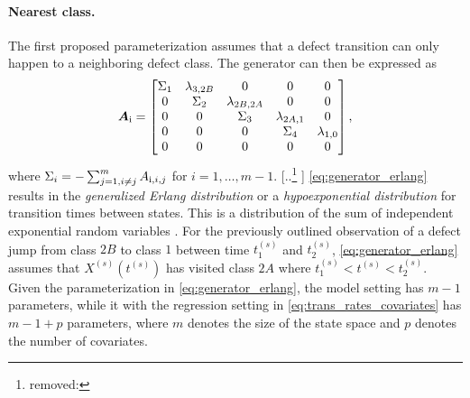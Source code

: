 \documentclass{article}
\newcommand{\myparagraph}[1]{\paragraph{#1}\mbox{}\\}
\newcommand{\RN}[1]{\textup{\uppercase\expandafter{\romannumeral#1}}}
\providecommand{\DIFadd}[1]{{\protect\color{blue} \sf #1}} %
\providecommand{\DIFdel}[1]{{\protect\color{red} [..\footnote{removed: #1} ]}} %
\providecommand{\DIFaddbegin}{} %
\providecommand{\DIFaddend}{} %
\providecommand{\DIFdelbegin}{} %
\providecommand{\DIFdelend}{} %
\begin{document}
\DIFdelend \DIFaddbegin \paragraph{\DIFadd{Nearest class.}} 
\DIFaddend The first proposed parameterization assumes that a defect transition can only happen to a neighboring defect class. The generator can then be expressed as
\begin{align}
    \bm{A}_{\RN{1}} = \begin{bmatrix} 
    \Sigma_1 & \lambda_{3,2B} & 0 & 0 & 0 \\
    0 & \Sigma_2 & \lambda_{2B, 2A} & 0 & 0 \\
    0 & 0 & \Sigma_3 & \lambda_{2A, 1} & 0 \\
    0 & 0 & 0 & \Sigma_4 & \lambda_{1, 0} \\
    0 & 0 & 0 & 0 & 0 \\
    \end{bmatrix}, \label{eq:generator_erlang}
\end{align}
where $\Sigma_i = -\sum_{j=1, i \neq j}^m A_{\RN{1},i,j}$ for $i = 1, \dots, m-1$. 
\DIFdelbegin \DIFdel{ }\DIFdelend \DIFaddbegin \DIFadd{\cref{eq:generator_erlang} }\DIFaddend results in the \textit{generalized Erlang distribution} or a \textit{hypoexponential distribution} for transition times between states. This is a distribution of the sum of independent exponential random variables \citep[Section 3.1]{bladt_nielsen}. For the previously outlined observation of a defect jump from class $2B$ to class $1$ between time $t_1^{(s)}$ and $t^{(s)}_2$, \cref{eq:generator_erlang} assumes that $X^{(s)}\left(t^{(s)}\right)$ has visited class $2A$ where $t^{(s)}_1 < t^{(s)} < t^{(s)}_2$.
Given the parameterization in \cref{eq:generator_erlang}, the model setting has $m-1$ parameters, while it with the regression setting in \cref{eq:trans_rates_covariates} has $m-1 + p$ parameters, where $m$ denotes the size of the state space and $p$ denotes the number of covariates.
\end{document}
